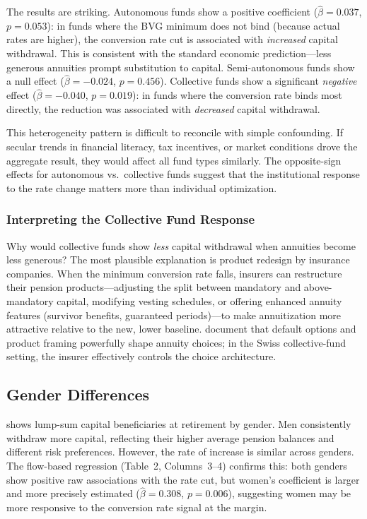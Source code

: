 \documentclass[12pt]{article}
\begin{document}


The results are striking. Autonomous funds show a positive coefficient ($\hat{\beta} = 0.037$, $p = 0.053$): in funds where the BVG minimum does not bind (because actual rates are higher), the conversion rate cut is associated with \textit{increased} capital withdrawal. This is consistent with the standard economic prediction---less generous annuities prompt substitution to capital. Semi-autonomous funds show a null effect ($\hat{\beta} = -0.024$, $p = 0.456$). Collective funds show a significant \textit{negative} effect ($\hat{\beta} = -0.040$, $p = 0.019$): in funds where the conversion rate binds most directly, the reduction was associated with \textit{decreased} capital withdrawal.

This heterogeneity pattern is difficult to reconcile with simple confounding. If secular trends in financial literacy, tax incentives, or market conditions drove the aggregate result, they would affect all fund types similarly. The opposite-sign effects for autonomous vs.\ collective funds suggest that the institutional response to the rate change matters more than individual optimization.

\subsubsection*{Interpreting the Collective Fund Response} Why would collective funds show \textit{less} capital withdrawal when annuities become less generous? The most plausible explanation is product redesign by insurance companies. When the minimum conversion rate falls, insurers can restructure their pension products---adjusting the split between mandatory and above-mandatory capital, modifying vesting schedules, or offering enhanced annuity features (survivor benefits, guaranteed periods)---to make annuitization more attractive relative to the new, lower baseline. \citet{beshears2014annuitization} document that default options and product framing powerfully shape annuity choices; in the Swiss collective-fund setting, the insurer effectively controls the choice architecture.

\subsection{Gender Differences}

 shows lump-sum capital beneficiaries at retirement by gender. Men consistently withdraw more capital, reflecting their higher average pension balances and different risk preferences. However, the rate of increase is similar across genders. The flow-based regression (Table~2, Columns~3--4) confirms this: both genders show positive raw associations with the rate cut, but women's coefficient is larger and more precisely estimated ($\hat{\beta} = 0.308$, $p = 0.006$), suggesting women may be more responsive to the conversion rate signal at the margin.
\end{document}
